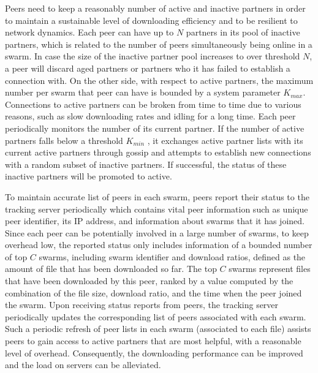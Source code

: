 \documentclass[conference]{IEEEtran}
\begin{document}
Peers need to keep a reasonably number of active and inactive partners in order to maintain a sustainable level of downloading efficiency and to be resilient to network dynamics. 
Each peer can have up to $N$ partners in its pool of inactive partners, which is related to the number of peers simultaneously being online in a swarm.
In case the size of the inactive partner pool increases to over threshold $N$, a peer will discard aged partners or partners who it has failed to establish a connection with. 
On the other side, with respect to active partners, the maximum number per swarm that peer can have is bounded by a system parameter $K_{max}$.
Connections to active partners can be broken from time to time due to various reasons, such as slow downloading rates and idling for a long time.
Each peer periodically monitors the number of its current partner. 
If the number of active partners falls below a threshold $K_{min}$ , it exchanges active partner lists with its current active partners through gossip and attempts to establish new connections with a random subset of inactive partners.
If successful, the status of these inactive partners will be promoted to active. 

To maintain accurate list of peers in each swarm, peers report their status to the tracking server periodically which contains vital peer information such as unique peer identifier, its IP address, and information about swarms that it has joined. 
Since each peer can be potentially involved in a large number of swarms, to keep overhead low, the reported status only includes information of a bounded number of top $C$ swarms, including swarm identifier and download ratios, defined as the amount of file that has been downloaded so far. 
The top $C$ swarms represent files that have been downloaded by this peer, ranked by a value computed by the combination of the file size, download ratio, and the time when the peer joined the swarm. 
Upon receiving status reports from peers, the tracking server periodically updates the corresponding list of peers associated with each swarm.
Such a periodic refresh of peer lists in each swarm (associated to each file) assists peers to gain access to active partners that are most helpful, with a reasonable level of overhead. 
Consequently, the downloading performance can be improved and the load on servers can be alleviated. 
\end{document}
